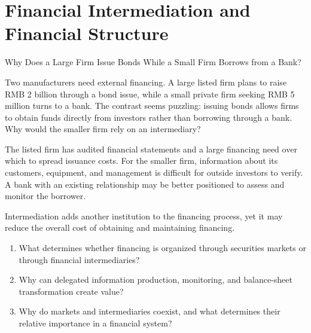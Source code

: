 \chapter{Financial Intermediation and Financial Structure}
\label{chap:Financial_Intermediation_and_Financial_Structure}

\begin{openingcase}{Why Does a Large Firm Issue Bonds While a Small Firm Borrows from a Bank?}

Two manufacturers need external financing. A large listed firm plans to raise RMB 2 billion through a bond issue, while a small private firm seeking RMB 5 million turns to a bank. The contrast seems puzzling: issuing bonds allows firms to obtain funds directly from investors rather than borrowing through a bank. Why would the smaller firm rely on an intermediary?

The listed firm has audited financial statements and a large financing need over which to spread issuance costs. For the smaller firm, information about its customers, equipment, and management is difficult for outside investors to verify. A bank with an existing relationship may be better positioned to assess and monitor the borrower.

Intermediation adds another institution to the financing process, yet it may reduce the overall cost of obtaining and maintaining financing.

\end{openingcase}


\begin{tcolorbox}[
  enhanced,
  colback=FinanceBlue!6,
  colframe=FinanceBlue,
  boxrule=0.6pt,
  sharp corners,
  left=8pt,
  right=8pt,
  top=7pt,
  bottom=7pt,
  before skip=1em,
  after skip=1.6em,
  title=\textbf{Core Questions},
  coltitle=white,
  colbacktitle=FinanceBlue,
  fonttitle=\bfseries,
  attach boxed title to top left={xshift=6pt,yshift=-2mm},
  boxed title style={
    boxrule=0pt,
    sharp corners,
    left=5pt,
    right=5pt,
    top=2pt,
    bottom=2pt
  }
]
\begin{enumerate}[
  leftmargin=*,
  label=\textcolor{FinanceBlue}{\textbf{\arabic*.}},
  itemsep=0.55em,
  topsep=0.2em
]
\item What determines whether financing is organized through securities markets or through financial intermediaries?

\item Why can delegated information production, monitoring, and balance-sheet transformation create value?

\item Why do markets and intermediaries coexist, and what determines their relative importance in a financial system?

\end{enumerate}
\end{tcolorbox}

